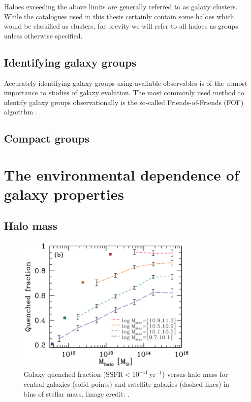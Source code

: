 \noindent
Haloes exceeding the above limits are generally referred to as galaxy
clusters.  While the catalogues used in this thesis certainly
contain some haloes which would be classified as clusters, for brevity
we will refer to all haloes as groups unless otherwise specified.

\subsection{Identifying galaxy groups}
\label{sec:identify_groups}

Accurately identifying galaxy groups using available observables is of
the utmost importance to studies of galaxy evolution.  The most
commonly used method to identify galaxy groups observationally is the
so-called Friends-of-Friends (FOF) algorithm \citep[e.g.][]{huchra1982}.

\subsection{Compact groups}
\label{sec:compact_groups}

\section{The environmental dependence of galaxy properties}
\label{sec:enviro_dependence}

\subsection{Halo mass}
\label{sec:halo_mass}

\begin{figure}
  \centering
  \includegraphics[width=0.8\textwidth]{quenchFrac_wetzel.png}
  \caption{Galaxy quenched fraction ($\mathrm{SSFR} <
    10^{-11}\,\mathrm{yr^{-1}}$) versus halo mass for central galaxies
    (solid points) and satellite galaxies (dashed lines) in bins of stellar mass.  Image credit: \citet{wetzel2012}.}
  \label{fig:quenchFrac_wetzel}
\end{figure}

